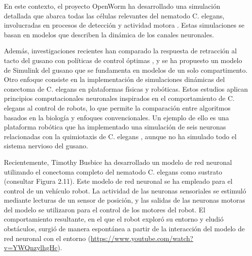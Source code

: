 En este contexto, el proyecto OpenWorm ha desarrollado una simulación detallada que abarca todas las células relevantes del nematodo C. elegans, involucradas en procesos de detección y actividad motora \cite{sarma_openworm_2018}. Estas simulaciones se basan en modelos que describen la dinámica de los canales neuronales.

Además, investigaciones recientes han comparado la respuesta de retracción al tacto del gusano con políticas de control óptimas \cite{lechner_worm-level_2017}, y se ha propuesto un modelo de Simulink del gusano que se fundamenta en modelos de un solo compartimento. Otro enfoque consiste en la implementación de simulaciones dinámicas del conectoma de C. elegans en plataformas físicas y robóticas. Estos estudios aplican principios computacionales neuronales inspirados en el comportamiento de C. elegans al control de robots, lo que permite la comparación entre algoritmos basados en la biología y enfoques convencionales. Un ejemplo de ello es una plataforma robótica que ha implementado una simulación de seis neuronas relacionadas con la quimiotaxis de C. elegans \cite{morse_robust_1998}, aunque no ha simulado todo el sistema nervioso del gusano.

Recientemente, Timothy Busbice \cite{Timothy_robot}  ha desarrollado un modelo de red neuronal utilizando el conectoma completo del nematodo C. elegans como sustrato (consultar Figura 2.11). Este modelo de red neuronal se ha empleado para el control de un vehículo robot. La actividad de las neuronas sensoriales se estimuló mediante lecturas de un sensor de posición, y las salidas de las neuronas motoras del modelo se utilizaron para el control de los motores del robot. El comportamiento resultante, en el que el robot exploró su entorno y eludió obstáculos, surgió de manera espontánea a partir de la interacción del modelo de red neuronal con el entorno (\url{https://www.youtube.com/watch?v=YWQnzylhgHc}).




